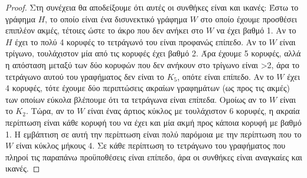 \documentclass[a4paper, oneside, 11pt]{article}
\theoremstyle{definition}
\begin{document}
\begin{enumerate}
\begin{proof}
Στη συνέχεια θα αποδείξουμε ότι αυτές οι συνθήκες είναι και ικανές: Έστω το γράφημα $H$, το οποίο είναι ένα δισυνεκτικό γράφημα $W$ στο οποίο έχουμε προσθέσει επιπλέον ακμές, τέτοιες ώστε το άκρο που
δεν ανήκει στο $W$ να έχει βαθμό 1. Αν το $H$ έχει το πολύ 4 κορυφές το τετράγωνό του 
είναι προφανώς επίπεδο. Αν το $W$ είναι τρίγωνο, τουλάχιστον μία από τις κορυφές έχει βαθμό 2. Άρα έχουμε 5 κορυφές, αλλά η απόσταση 
μεταξύ των δύο κορυφών που δεν ανήκουν στο τρίγωνο είναι >2, άρα το τετράγωνο αυτού του γραφήματος δεν είναι το $K_5$, οπότε είναι επίπεδο. Αν το $W$ έχει 4 κορυφές, 
τότε έχουμε δύο περιπτώσεις ακραίων γραφημάτων (ως προς τις ακμές) των οποίων εύκολα βλέπουμε ότι τα τετράγωνα είναι επίπεδα. Ομοίως αν το $W$ είναι το $K_2$. Τώρα, αν το $W$ είναι ένας άρτιος κύκλος
με τουλάχιστον 6 κορυφές, η ακραία περίπτωση είναι κάθε κορυφή του να έχει και μία ακμή προς κάποια κορυφή με βαθμό 1. Η εμβάπτιση σε αυτή την περίπτωση είναι πολύ παρόμοια με την περίπτωση που το $W$
είναι κύκλος μήκους 4. Σε κάθε περίπτωση το τετράγωνο του γραφήματος που πληροί τις παραπάνω προϋποθέσεις είναι επίπεδο, άρα οι συνθήκες είναι αναγκαίες και ικανές.

	\end{proof}


\end{enumerate}
\end{document}
